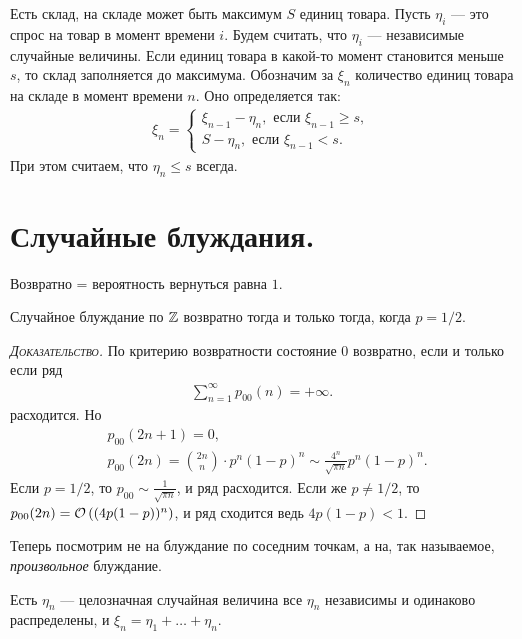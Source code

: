 \documentclass[../main.tex]{subfiles}
\begin{document}
\begin{exmpl}
 Есть склад, на складе может быть максимум $ S $ единиц товара. Пусть $ \eta_i $ --- это спрос на товар в момент времени $ i $. Будем считать, что $ \eta_i $ --- независимые случайные величины. Если единиц товара в какой-то момент становится меньше $ s $, то склад заполняется до максимума. Обозначим за $ \xi_n $ количество единиц товара на складе в момент времени $ n $. Оно определяется так:
 \begin{align*}
  \xi_n = \begin{cases}
   \xi_{n-1} - \eta_n, \text{ если }  \xi_{n-1} \geqslant s, \\
   S - \eta_n, \text{ если } \xi_{n-1} < s.
  \end{cases}
 \end{align*} При этом считаем, что $ \eta_n \leqslant s $ всегда.
\end{exmpl}

\newpage
\section{Случайные блуждания.}

Возвратно = вероятность вернуться равна $ 1 $.

\begin{thm}
 Случайное блуждание по $ \mathbb{Z} $ возвратно тогда и только тогда, когда $ p = 1 / 2 $.
\end{thm}
\begin{proof}[\normalfont\textsc{Доказательство}]
 По критерию возвратности состояние $ 0 $ возвратно, если и только если ряд
 \begin{align}
  \sum_{n=1}^{\infty}p_{00}(n) = +\infty.
 \end{align} расходится. Но
 \begin{align*}
  &p_{00}(2n+1)= 0, \\
  &p_{00}(2n) = \binom{2n} n \cdot p^{n}(1-p)^{n} \sim \frac{4^{n}}{\sqrt{\pi n}} p^{n}(1-p)^{n}.
 \end{align*} Если $ p = 1 / 2 $, то $ p_{00} \sim \frac{1}{\sqrt{\pi n}} $, и ряд расходится. Если же $ p \neq 1 / 2 $, то $ p_{00}(2n) = \mathcal{O} \left( (4p(1-p))^{n} \right) $, и ряд сходится ведь $ 4p(1-p) < 1 $.
\end{proof}

Теперь посмотрим не на блуждание по соседним точкам, а на, так называемое, \textit{произвольное} блуждание.

\begin{df}
 Есть $ \eta_n $ --- целозначная случайная величина все $ \eta_n $ независимы и одинаково распределены, и $ \xi_n = \eta_1 + \ldots + \eta_n $.
\end{df}
\end{document}
